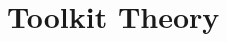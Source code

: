 \documentclass{src/manual}
\begin{document}
\bibliographyunit[\chapter]

\tableofcontents
\part{Toolkit Theory}


\end{document}

